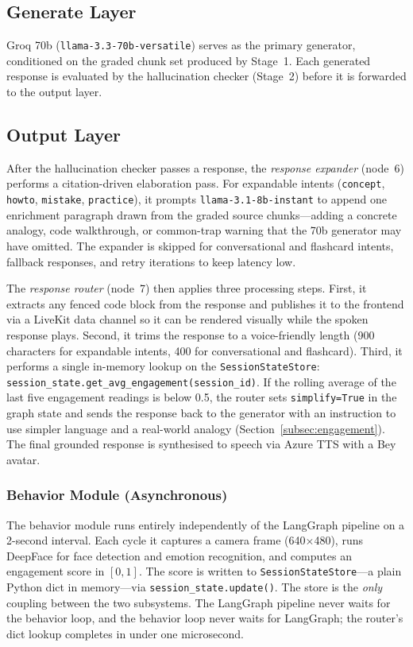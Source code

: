 \documentclass[conference]{IEEEtran}
\begin{document}
\subsection{Generate Layer}

Groq 70b (\texttt{llama-3.3-70b-versatile}) serves as the primary
generator, conditioned on the graded chunk set produced by Stage~1.
Each generated response is evaluated by the hallucination checker
(Stage~2) before it is forwarded to the output layer.

\subsection{Output Layer}

After the hallucination checker passes a response, the
\emph{response expander} (node~6) performs a citation-driven
elaboration pass.
For expandable intents (\texttt{concept}, \texttt{howto},
\texttt{mistake}, \texttt{practice}), it prompts
\texttt{llama-3.1-8b-instant} to append one enrichment paragraph
drawn from the graded source chunks---adding a concrete analogy,
code walkthrough, or common-trap warning that the 70b generator
may have omitted.
The expander is skipped for conversational and flashcard intents,
fallback responses, and retry iterations to keep latency low.

The \emph{response router} (node~7) then applies three processing
steps.
First, it extracts any fenced code block from the response and
publishes it to the frontend via a LiveKit data channel so it can
be rendered visually while the spoken response plays.
Second, it trims the response to a voice-friendly length (900
characters for expandable intents, 400 for conversational and
flashcard).
Third, it performs a single in-memory lookup on the
\texttt{SessionStateStore}:
\texttt{session\_state.get\_avg\_engagement(session\_id)}.
If the rolling average of the last five engagement readings is below
0.5, the router sets \texttt{simplify=True} in the graph state and
sends the response back to the generator with an instruction to use
simpler language and a real-world analogy
(Section~\ref{subsec:engagement}).
The final grounded response is synthesised to speech via Azure TTS
with a Bey avatar.

\subsubsection{Behavior Module (Asynchronous)}
The behavior module runs entirely independently of the LangGraph
pipeline on a 2-second interval.
Each cycle it captures a camera frame (640$\times$480), runs
DeepFace for face detection and emotion recognition, and computes an
engagement score in $[0, 1]$.
The score is written to \texttt{SessionStateStore}---a plain Python
dict in memory---via \texttt{session\_state.update()}.
The store is the \emph{only} coupling between the two subsystems.
The LangGraph pipeline never waits for the behavior loop, and the
behavior loop never waits for LangGraph; the router's dict lookup
completes in under one microsecond.
\end{document}

